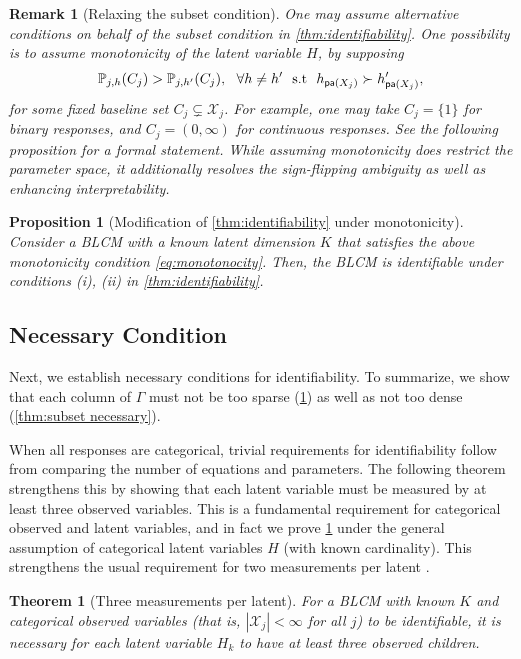 \documentclass[10pt]{article} %
\newtheorem{theorem}{Theorem}
\newtheorem{proposition}{Proposition}
\newtheorem{remark}{Remark}
\newcommand{\PP}{\mathbb P}
\newcommand{\pa}{\textsf{\upshape pa}}
\begin{document}
\begin{remark}[Relaxing the subset condition]
    One may assume alternative conditions on behalf of the subset condition in \cref{thm:identifiability}. One possibility is to assume \emph{monotonicity} of the latent variable $H$, by supposing 
    \begin{align}\label{eq:monotonocity}
        \PP_{j,h}(C_j) > \PP_{j,h'}(C_j), ~~ \forall h \neq h' ~~ \text{s.t} ~~ h_{\pa(X_j)} \succ h'_{\pa(X_j)},
    \end{align} for some fixed baseline set $C_j \subsetneq \mathcal{X}_j$. For example, one may take $C_j = \{1\}$ for binary responses, and $C_j = (0, \infty)$ for continuous responses. See the following proposition for a formal statement. While assuming monotonicity does restrict the parameter space, it additionally resolves the sign-flipping ambiguity as well as enhancing interpretability.
\end{remark}

\begin{proposition}[Modification of \cref{thm:identifiability} under monotonicity]\label{prop:identifiability monotone}
    Consider a BLCM with a known latent dimension $K$ that satisfies the above monotonicity condition \eqref{eq:monotonocity}.
    Then, the BLCM is identifiable under conditions (i), (ii) in \cref{thm:identifiability}.
\end{proposition}
%

\subsection{Necessary Condition}
Next, we establish necessary conditions for identifiability. To summarize, we show that each column of $\Gamma$ must not be too sparse (\cref{thm:necessary}) as well as not too dense (\cref{thm:subset necessary}).

When all responses are categorical, trivial requirements for identifiability follow from comparing the number of equations and parameters. 
%
The following theorem strengthens this by showing that each latent variable must be measured by at least three observed variables. This is a fundamental requirement for categorical observed and latent variables, and in fact we prove \cref{thm:necessary} under the general assumption of categorical latent variables $H$ (with known cardinality). 
This strengthens the usual requirement for two measurements per latent \citep[e.g. see Lemma 3 in][]{evans2016graphs}. 
%
%

\begin{theorem}[Three measurements per latent]\label{thm:necessary}
    For a BLCM with known $K$ and categorical observed variables (that is, $|\mathcal{X}_j| < \infty$ for all $j$) to be identifiable, it is necessary for each latent variable $H_k$ to have at least \emph{three} observed children. 
\end{theorem}
\end{document}
